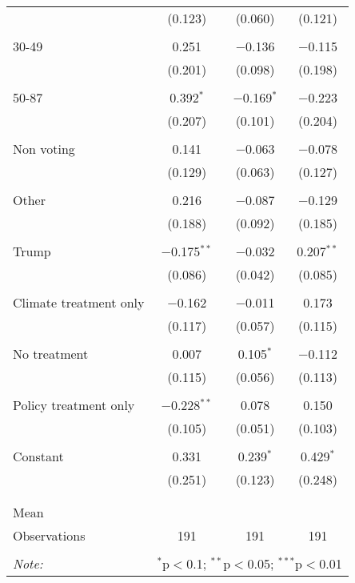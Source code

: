 \begin{tabular}{@{\extracolsep{5pt}}lccc}
  & (0.123) & (0.060) & (0.121) \\ 
  & & & \\ 
 30-49 & 0.251 & $-$0.136 & $-$0.115 \\ 
  & (0.201) & (0.098) & (0.198) \\ 
  & & & \\ 
 50-87 & 0.392$^{*}$ & $-$0.169$^{*}$ & $-$0.223 \\ 
  & (0.207) & (0.101) & (0.204) \\ 
  & & & \\ 
 Non voting & 0.141 & $-$0.063 & $-$0.078 \\ 
  & (0.129) & (0.063) & (0.127) \\ 
  & & & \\ 
 Other & 0.216 & $-$0.087 & $-$0.129 \\ 
  & (0.188) & (0.092) & (0.185) \\ 
  & & & \\ 
 Trump & $-$0.175$^{**}$ & $-$0.032 & 0.207$^{**}$ \\ 
  & (0.086) & (0.042) & (0.085) \\ 
  & & & \\ 
 Climate treatment only & $-$0.162 & $-$0.011 & 0.173 \\ 
  & (0.117) & (0.057) & (0.115) \\ 
  & & & \\ 
 No treatment & 0.007 & 0.105$^{*}$ & $-$0.112 \\ 
  & (0.115) & (0.056) & (0.113) \\ 
  & & & \\ 
 Policy treatment only & $-$0.228$^{**}$ & 0.078 & 0.150 \\ 
  & (0.105) & (0.051) & (0.103) \\ 
  & & & \\ 
 Constant & 0.331 & 0.239$^{*}$ & 0.429$^{*}$ \\ 
  & (0.251) & (0.123) & (0.248) \\ 
  & & & \\ 
\hline \\[-1.8ex] 
Mean &  &  &  \\ 
Observations & 191 & 191 & 191 \\ 
\hline 
\hline \\[-1.8ex] 
\textit{Note:}  & \multicolumn{3}{r}{$^{*}$p$<$0.1; $^{**}$p$<$0.05; $^{***}$p$<$0.01} \\ 
\end{tabular} 
